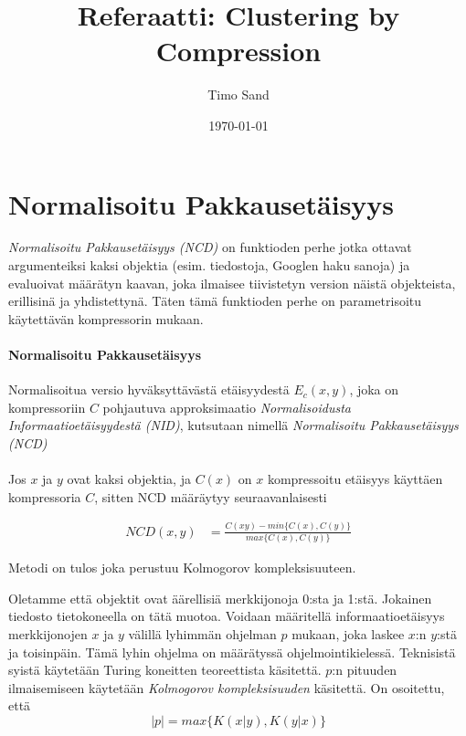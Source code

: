 \documentclass[finnish]{tktltiki2}
\title{Referaatti: Clustering by Compression}
\author{Timo Sand}
\date{\today}
\theoremstyle{definition}
\theoremstyle{remark}
\begin{document}

\frontmatter      %

\maketitle        %



\mainmatter       %

\section{Normalisoitu Pakkausetäisyys} %
\label{sec:normalisoitu_pakkauset_isyys}

  \emph{Normalisoitu Pakkausetäisyys (NCD)} on funktioden perhe jotka ottavat argumenteiksi kaksi objektia (esim. tiedostoja, Googlen haku sanoja) ja evaluoivat määrätyn kaavan, joka ilmaisee tiivistetyn version näistä objekteista, erillisinä ja yhdistettynä. Täten tämä funktioden perhe on parametrisoitu käytettävän kompressorin mukaan.

  \paragraph{Normalisoitu Pakkausetäisyys} %
  \label{par:normalisoitu_pakkauset_isyys}

    Normalisoitua versio hyväksyttävästä etäisyydestä $E_c(x,y)$, joka on kompressoriin $C$ pohjautuva approksimaatio \emph{Normalisoidusta Informaatioetäisyydestä (NID)}, kutsutaan nimellä \emph{Normalisoitu Pakkausetäisyys (NCD)} \cite{CV05}
  \\\\
    Jos $x$ ja $y$ ovat kaksi objektia, ja $C(x)$ on $x$ kompressoitu etäisyys  käyttäen kompressoria $C$, sitten NCD määräytyy seuraavanlaisesti

    \begin{align*}
      NCD(x,y) &= \frac{C(xy)-min\{C(x),C(y)\}}{max\{C(x),C(y)\}}
    \end{align*}

    Metodi on tulos joka perustuu Kolmogorov kompleksisuuteen.

    Oletamme että objektit ovat äärellisiä merkkijonoja 0:sta ja 1:stä. Jokainen tiedosto tietokoneella on tätä muotoa. Voidaan määritellä informaatioetäisyys merkkijonojen $x$ ja $y$ välillä lyhimmän ohjelman $p$ mukaan, joka laskee $x$:n $y$:stä ja toisinpäin. Tämä lyhin ohjelma on määrätyssä ohjelmointikielessä. Teknisistä syistä käytetään Turing koneitten teoreettista käsitettä.
    $p$:n pituuden ilmaisemiseen käytetään \emph{Kolmogorov kompleksisuuden} käsitettä. On osoitettu, että
    $$|p| = max\{K(x|y),K(y|x)\}$$
\end{document}

